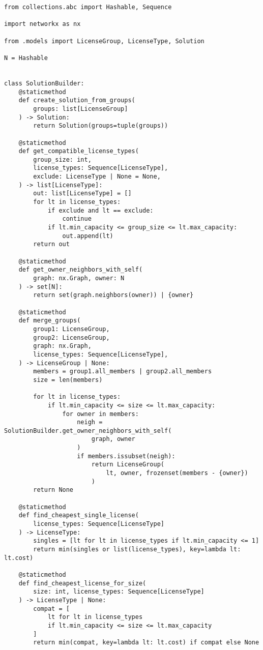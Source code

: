 \begin{verbatim}
from collections.abc import Hashable, Sequence

import networkx as nx

from .models import LicenseGroup, LicenseType, Solution

N = Hashable


class SolutionBuilder:
    @staticmethod
    def create_solution_from_groups(
        groups: list[LicenseGroup]
    ) -> Solution:
        return Solution(groups=tuple(groups))

    @staticmethod
    def get_compatible_license_types(
        group_size: int,
        license_types: Sequence[LicenseType],
        exclude: LicenseType | None = None,
    ) -> list[LicenseType]:
        out: list[LicenseType] = []
        for lt in license_types:
            if exclude and lt == exclude:
                continue
            if lt.min_capacity <= group_size <= lt.max_capacity:
                out.append(lt)
        return out

    @staticmethod
    def get_owner_neighbors_with_self(
        graph: nx.Graph, owner: N
    ) -> set[N]:
        return set(graph.neighbors(owner)) | {owner}

    @staticmethod
    def merge_groups(
        group1: LicenseGroup,
        group2: LicenseGroup,
        graph: nx.Graph,
        license_types: Sequence[LicenseType],
    ) -> LicenseGroup | None:
        members = group1.all_members | group2.all_members
        size = len(members)

        for lt in license_types:
            if lt.min_capacity <= size <= lt.max_capacity:
                for owner in members:
                    neigh = SolutionBuilder.get_owner_neighbors_with_self(
                        graph, owner
                    )
                    if members.issubset(neigh):
                        return LicenseGroup(
                            lt, owner, frozenset(members - {owner})
                        )
        return None

    @staticmethod
    def find_cheapest_single_license(
        license_types: Sequence[LicenseType]
    ) -> LicenseType:
        singles = [lt for lt in license_types if lt.min_capacity <= 1]
        return min(singles or list(license_types), key=lambda lt: lt.cost)

    @staticmethod
    def find_cheapest_license_for_size(
        size: int, license_types: Sequence[LicenseType]
    ) -> LicenseType | None:
        compat = [
            lt for lt in license_types
            if lt.min_capacity <= size <= lt.max_capacity
        ]
        return min(compat, key=lambda lt: lt.cost) if compat else None
\end{verbatim}

